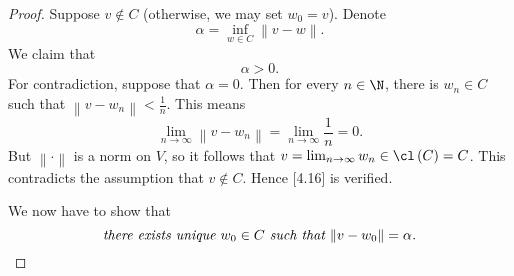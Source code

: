 \documentclass[pmath450]{subfiles}
\begin{document}
    \begin{proof}
        Suppose $v\notin C$ (otherwise, we may set $w_0=v$). Denote
        \begin{equation*}
            \alpha = \inf_{w\in C}\left\lVert v-w\right\rVert.
        \end{equation*}
        We claim that 
        \begin{equation}
            \alpha>0.
        \end{equation}
        For contradiction, suppose that $\alpha=0$. Then for every $n\in\N$, there is $w_n\in C$ such that $\left\lVert v-w_n\right\rVert<\frac{1}{n}$. This means
        \begin{equation*}
            \lim_{n\to\infty} \left\lVert v-w_n\right\rVert = \lim_{n\to\infty} \frac{1}{n} = 0.
        \end{equation*}
        But $\left\lVert \cdot\right\rVert$ is a norm on $V$, so it follows that $v=\lim_{n\to\infty}w_n\in\cl\left( C \right)=C$. This contradicts the assumption that $v\notin C$. Hence [4.16] is verified.

        We now have to show that
        \begin{equation}
            \text{\textit{there exists unique $w_0\in C$ such that $\left\lVert v-w_0\right\rVert=\alpha$.}}
        \end{equation}
        

\end{proof}
\end{document}
